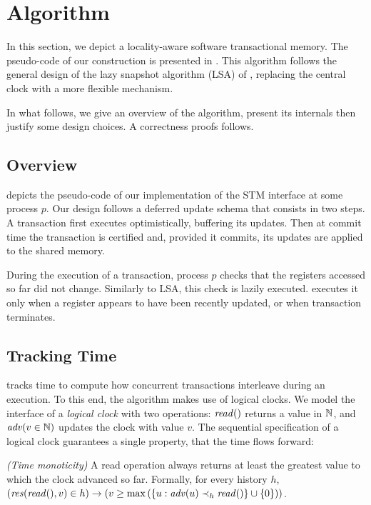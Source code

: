 \section{Algorithm}

In this section, we depict a locality-aware software transactional memory.
The pseudo-code of our construction is presented in .
This algorithm follows the general design of the lazy snapshot algorithm (LSA) of \citet{FelberFMR10}, replacing the central clock with a more flexible mechanism.

In what follows, we give an overview of the algorithm, present its internals then justify some design choices.
A correctness proofs follows.

\subsection{Overview}

 depicts the pseudo-code of our implementation of the STM interface at some process $p$.
Our design follows a deferred update schema that consists in two steps.
A transaction first executes optimistically, buffering its updates.
Then at commit time the transaction is certified and, provided it commits, its updates are applied to the shared memory.

During the execution of a transaction, process $p$ checks that the registers accessed so far did not change.
Similarly to LSA, this check is lazily executed.
 executes it only when a register appears to have been recently updated, or when transaction terminates.

\subsection{Tracking Time}


 tracks time to compute how concurrent transactions interleave during an execution.
To this end, the algorithm makes use of logical clocks.
We model the interface of a \emph{logical clock} with two operations: $\cread$ returns a value in $\naturalSet$, and $\cadv(v \in \naturalSet)$ updates the clock with value $v$.
The sequential specification of a logical clock guarantees a single property, that the time flows forward:
\begin{inparaenum}
\item[\emph{(Time monoticity)}]
  A read operation always returns at least the greatest value to which the clock advanced so far.
  Formally, for every history $h$, $(\responseAny{\cread}{v} \in h) \implies (v \geq \max{(\{u : \cadv(u) \hb_h \cread \} \union \{0\})})$.
\end{inparaenum}

